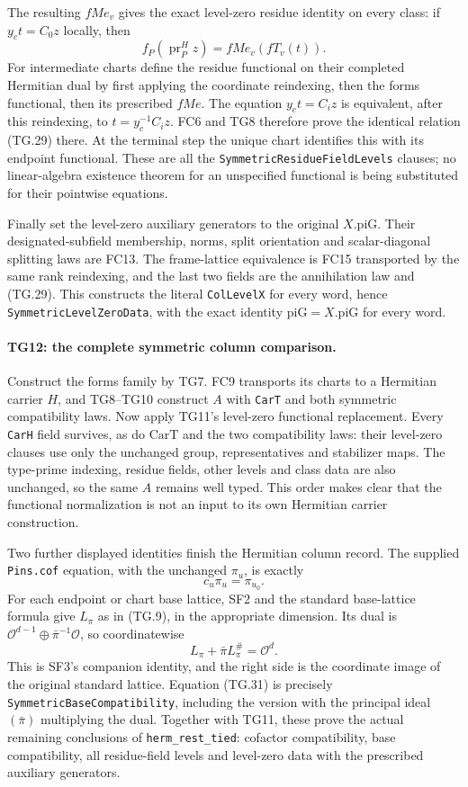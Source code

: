 The resulting $fMe_v$ gives the exact level-zero residue identity
on every class: if $y_c t=C_0z$ locally, then
\[
        f_P(\operatorname{pr}^{H}_P z)=fMe_v(fT_v(t)).
 \tag{TG.29}
\]
For intermediate charts define the residue functional on their
completed Hermitian dual by first applying the coordinate
reindexing, then the forms functional, then its prescribed
$fMe$. The equation $y_ct=C_i z$ is equivalent, after this
reindexing, to $t=y_c^{-1}C_i z$. FC6 and TG8 therefore prove
the identical relation (TG.29) there. At the terminal step the
unique chart identifies this with its endpoint functional.
These are all the \texttt{SymmetricResidueFieldLevels}
clauses; no linear-algebra existence theorem for an unspecified
functional is being substituted for their pointwise equations.

Finally set the level-zero auxiliary generators to the original
$X.\mathrm{piG}$. Their designated-subfield membership, norms,
split orientation and scalar-diagonal splitting laws are FC13.
The frame-lattice equivalence is FC15 transported by the same
rank reindexing, and the last two fields are the annihilation
law and (TG.29). This constructs the literal \texttt{ColLevelX}
for every word, hence \texttt{SymmetricLevelZeroData}, with
the exact identity $\mathrm{piG}=X.\mathrm{piG}$ for every word.

\paragraph{TG12: the complete symmetric column comparison.}
Construct the forms family by TG7. FC9 transports its charts to
a Hermitian carrier $H$, and TG8--TG10 construct $A$ with
\texttt{CarT} and both symmetric compatibility laws. Now apply
TG11's level-zero functional replacement. Every \texttt{CarH}
field survives, as do $\mathrm{CarT}$ and the two compatibility
laws: their level-zero clauses use only the unchanged group,
representatives and stabilizer maps. The type-prime indexing,
residue fields, other levels and class data are also unchanged,
so the same $A$ remains well typed. This order makes clear that
the functional normalization is not an input to its own
Hermitian carrier construction.

Two further displayed identities finish the Hermitian column
record. The supplied \texttt{Pins.cof} equation, with the
unchanged $\pi_u$, is exactly
\[
                 c_u\pi_u=\pi_{u_0}.
 \tag{TG.30}
\]
For each endpoint or chart base lattice, SF2 and the standard
base-lattice formula give $L_\pi$ as in (TG.9), in the
appropriate dimension. Its dual is
$\mathcal O^{d-1}\oplus\bar\pi^{-1}\mathcal O$, so
coordinatewise
\[
               L_\pi+\bar\pi L_\pi^{\#}=\mathcal O^d.
 \tag{TG.31}
\]
This is SF3's companion identity, and the right side is the
coordinate image of the original standard lattice. Equation
(TG.31) is precisely \texttt{SymmetricBaseCompatibility},
including the version with the principal ideal
$(\bar\pi)$ multiplying the dual. Together with TG11, these
prove the actual remaining conclusions of
\texttt{herm\_rest\_tied}: cofactor compatibility, base
compatibility, all residue-field levels and level-zero data
with the prescribed auxiliary generators.

